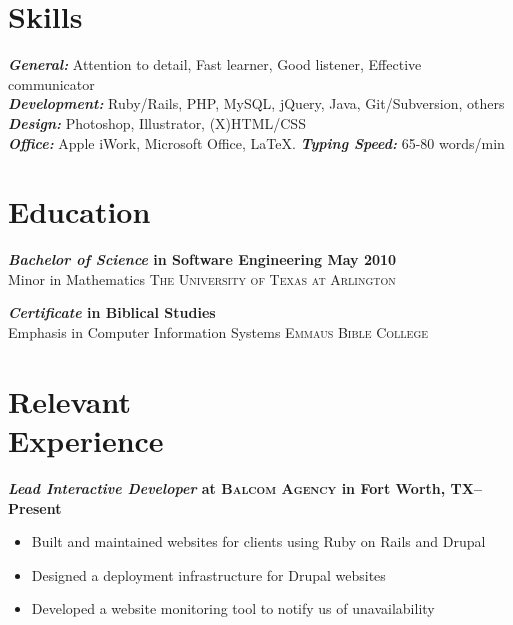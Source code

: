 \documentclass[margin]{res}
\newcommand{\sectionspace}{\vspace{8pt}}
\begin{document}
\begin{resume}

\section{\textsf{Skills}}

                \textbf{\textit{General:}} Attention to detail, Fast learner, Good listener, Effective communicator  \\
                \textbf{\textit{Development:}} Ruby/Rails, PHP, MySQL, jQuery, Java, Git/Subversion, others                \\
                \textbf{\textit{Design:}} Photoshop, Illustrator, (X)HTML/CSS                                       \\
                \textbf{\textit{Office:}} Apple iWork, Microsoft Office, \LaTeX. \textbf{\textit{Typing Speed:}} 65-80 words/min

\sectionspace

\section{\textsf{Education}}

                \textbf{\textit{Bachelor of Science} in Software Engineering \dotfill May 2010 }  \\
                Minor in Mathematics \hfill  \textsc{The University of Texas at Arlington}

                \textbf{\textit{Certificate} in Biblical Studies  } \\
                Emphasis in Computer Information Systems \hfill  \textsc{Emmaus Bible College}

\sectionspace


\section{\textsf{Relevant \\ Experience}}

                \textbf{\textit{Lead Interactive Developer}
         at \textsc{Balcom Agency} in Fort Worth, TX--Present}
         \vspace{-10pt}\begin{itemize} \itemsep -2pt %
           \item Built and maintained websites for clients using Ruby on Rails and Drupal
           \item Designed a deployment infrastructure for Drupal websites
           \item Developed a website monitoring tool to notify us of unavailability
         \end{itemize}


\end{resume}
\end{document}
